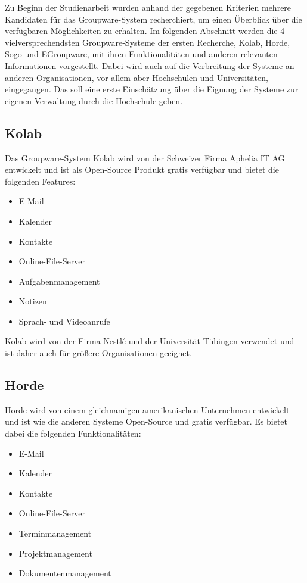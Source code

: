 Zu Beginn der Studienarbeit wurden anhand der gegebenen Kriterien mehrere Kandidaten für das Groupware-System recherchiert, um einen Überblick über die verfügbaren Möglichkeiten zu erhalten.
Im folgenden Abschnitt werden die 4 vielversprechendsten Groupware-Systeme der ersten Recherche, Kolab, Horde, Sogo und EGroupware, mit ihren Funktionalitäten und anderen relevanten Informationen vorgestellt.
Dabei wird auch auf die Verbreitung der Systeme an anderen Organisationen, vor allem aber Hochschulen und Universitäten, eingegangen.
Das soll eine erste Einschätzung über die Eignung der Systeme zur eigenen Verwaltung durch die Hochschule geben.


\subsection{Kolab}

Das Groupware-System Kolab wird von der Schweizer Firma Aphelia IT AG entwickelt und ist als Open-Source Produkt gratis verfügbar und bietet die folgenden Features:
\begin{itemize}
    \item E-Mail
    \item Kalender
    \item Kontakte
    \item Online-File-Server
    \item Aufgabenmanagement
    \item Notizen
    \item Sprach- und Videoanrufe
\end{itemize}
\autocite[Quelle:][]{kolab}

Kolab wird von der Firma Nestlé und der Universität Tübingen verwendet und ist daher auch für größere Organisationen geeignet.

\subsection{Horde}

Horde wird von einem gleichnamigen amerikanischen Unternehmen entwickelt und ist wie die anderen Systeme Open-Source und gratis verfügbar. Es bietet dabei die folgenden Funktionalitäten:
\begin{itemize}
    \item E-Mail
    \item Kalender
    \item Kontakte
    \item Online-File-Server
    \item Terminmanagement
    \item Projektmanagement
    \item Dokumentenmanagement
    
\end{itemize}
\autocite[Quelle:][]{horde}

